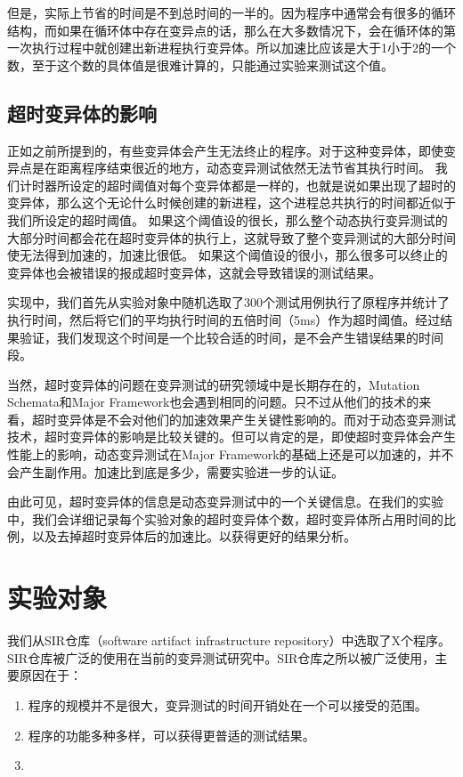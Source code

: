 \documentclass[nofonts]{ctexrep}
\begin{document}
但是，实际上节省的时间是不到总时间的一半的。因为程序中通常会有很多的循环结构，而如果在循环体中存在变异点的话，那么在大多数情况下，会在循环体的第一次执行过程中就创建出新进程执行变异体。所以加速比应该是大于1小于2的一个数，至于这个数的具体值是很难计算的，只能通过实验来测试这个值。

\subsection{超时变异体的影响}
正如之前所提到的，有些变异体会产生无法终止的程序。对于这种变异体，即使变异点是在距离程序结束很近的地方，动态变异测试依然无法节省其执行时间。
我们计时器所设定的超时阈值对每个变异体都是一样的，也就是说如果出现了超时的变异体，那么这个无论什么时候创建的新进程，这个进程总共执行的时间都近似于我们所设定的超时阈值。
如果这个阈值设的很长，那么整个动态执行变异测试的大部分时间都会花在超时变异体的执行上，这就导致了整个变异测试的大部分时间使无法得到加速的，加速比很低。
如果这个阈值设的很小，那么很多可以终止的变异体也会被错误的报成超时变异体，这就会导致错误的测试结果。

实现中，我们首先从实验对象中随机选取了300个测试用例执行了原程序并统计了执行时间，然后将它们的平均执行时间的五倍时间（5ms）作为超时阈值。经过结果验证，我们发现这个时间是一个比较合适的时间，是不会产生错误结果的时间段。

当然，超时变异体的问题在变异测试的研究领域中是长期存在的，Mutation Schemata和Major Framework也会遇到相同的问题。只不过从他们的技术的来看，超时变异体是不会对他们的加速效果产生关键性影响的。而对于动态变异测试技术，超时变异体的影响是比较关键的。但可以肯定的是，即使超时变异体会产生性能上的影响，动态变异测试在Major Framework的基础上还是可以加速的，并不会产生副作用。加速比到底是多少，需要实验进一步的认证。

由此可见，超时变异体的信息是动态变异测试中的一个关键信息。在我们的实验中，我们会详细记录每个实验对象的超时变异体个数，超时变异体所占用时间的比例，以及去掉超时变异体后的加速比。以获得更好的结果分析。

\section{实验对象}
我们从SIR仓库（software artifact infrastructure repository）中选取了X个程序。SIR仓库被广泛的使用在当前的变异测试研究中。SIR仓库之所以被广泛使用，主要原因在于：
\begin{enumerate}
\item
程序的规模并不是很大，变异测试的时间开销处在一个可以接受的范围。
\item
程序的功能多种多样，可以获得更普适的测试结果。
\item
\end{enumerate}
\end{document}
